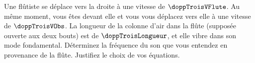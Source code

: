 Une flûtiste se déplace vers la droite à une vitesse de $\doppTroisVFlute$. Au même moment, vous êtes devant elle et vous vous déplacez vers elle à une vitesse de $\doppTroisVObs$. La longueur de la colonne d’air dans la flûte (supposée ouverte aux deux bouts) est de $\doppTroisLongueur$, et elle vibre dans son mode fondamental. Déterminez la fréquence du son que vous entendez en provenance de la flûte. Justifiez le choix de vos équations.